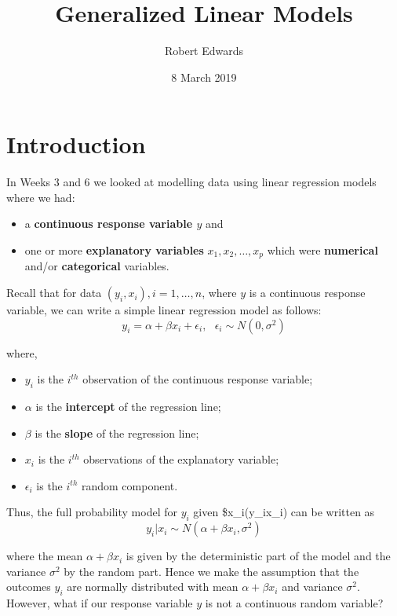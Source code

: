 \documentclass[]{article}
\title{Generalized Linear Models}
\author{Robert Edwards}
\date{8 March 2019}
\providecommand{\tightlist}{%
  \setlength{\itemsep}{0pt}\setlength{\parskip}{0pt}}
\begin{document}
\maketitle

\section{Introduction}\label{sec:Intro}

In Weeks 3 and 6 we looked at modelling data using linear regression
models where we had:

\begin{itemize}
\tightlist
\item
  a \textbf{continuous response variable \(y\)} and
\item
  one or more \textbf{explanatory variables} \(x_1, x_2, \dots ,x_p\)
  which were \textbf{numerical} and/or \textbf{categorical} variables.
\end{itemize}

Recall that for data \((y_i,x_i), i=1, \dots, n\), where \(y\) is a
continuous response variable, we can write a simple linear regression
model as follows:
\[y_i = \alpha + \beta x_i + \epsilon_i, ~~~ \epsilon_i \sim N(0, \sigma^2)\]

where,

\begin{itemize}
\tightlist
\item
  \(y_i\) is the \(i^{th}\) observation of the continuous response
  variable;
\item
  \(\alpha\) is the \textbf{intercept} of the regression line;
\item
  \(\beta\) is the \textbf{slope} of the regression line;
\item
  \(x_i\) is the \(i^{th}\) observations of the explanatory variable;
\item
  \(\epsilon_i\) is the \(i^{th}\) random component.
\end{itemize}

Thus, the full probability model for \(y_i\) given
\$x\_i(y\_i\textbar{}x\_i) can be written as
\[y_i|x_i \sim N(\alpha + \beta x_i, \sigma^2)\]

where the mean \(\alpha + \beta x_i\) is given by the deterministic part
of the model and the variance \(\sigma^2\) by the random part. Hence we
make the assumption that the outcomes \(y_i\) are normally distributed
with mean \(\alpha + \beta x_i\) and variance \(\sigma^2\). However,
what if our response variable \(y\) is not a continuous random variable?
\end{document}
